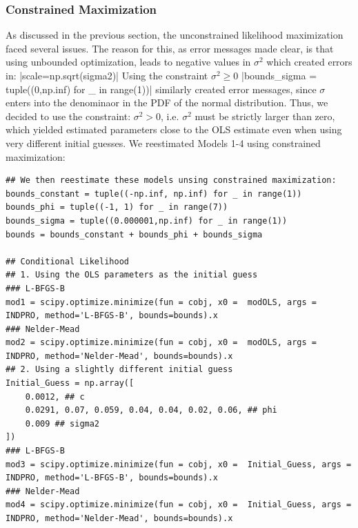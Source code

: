 \documentclass{article}
\begin{document}
\subsubsection{Constrained Maximization}
As discussed in the previous section, the unconstrained likelihood maximization faced several issues.
The reason for this, as error messages made clear, is that using unbounded optimization, leads to negative values in $\sigma^2$ which created errors in:
|scale=np.sqrt(sigma2)|
Using the constraint $\sigma^2 \geq 0$
|bounds_sigma = tuple((0,np.inf) for _ in range(1))|
similarly created error messages, since $\sigma$ enters into the denominaor in the PDF of the normal distribution.
Thus, we decided to use the constraint: $\sigma^2 > 0$, i.e. $\sigma^2$ must be strictly larger than zero, which yielded estimated parameters close to the OLS estimate even when using very different initial guesses.
We reestimated Models 1-4 using constrained maximization:
\begin{verbatim}
## We then reestimate these models unsing constrained maximization:
bounds_constant = tuple((-np.inf, np.inf) for _ in range(1))
bounds_phi = tuple((-1, 1) for _ in range(7))
bounds_sigma = tuple((0.000001,np.inf) for _ in range(1))
bounds = bounds_constant + bounds_phi + bounds_sigma

## Conditional Likelihood
## 1. Using the OLS parameters as the initial guess
### L-BFGS-B
mod1 = scipy.optimize.minimize(fun = cobj, x0 =  modOLS, args = INDPRO, method='L-BFGS-B', bounds=bounds).x
### Nelder-Mead
mod2 = scipy.optimize.minimize(fun = cobj, x0 =  modOLS, args = INDPRO, method='Nelder-Mead', bounds=bounds).x
## 2. Using a slightly different initial guess
Initial_Guess = np.array([
    0.0012, ## c
    0.0291, 0.07, 0.059, 0.04, 0.04, 0.02, 0.06, ## phi
    0.009 ## sigma2 
])
### L-BFGS-B
mod3 = scipy.optimize.minimize(fun = cobj, x0 =  Initial_Guess, args = INDPRO, method='L-BFGS-B', bounds=bounds).x
### Nelder-Mead
mod4 = scipy.optimize.minimize(fun = cobj, x0 =  Initial_Guess, args = INDPRO, method='Nelder-Mead', bounds=bounds).x
\end{verbatim}
\end{document}
